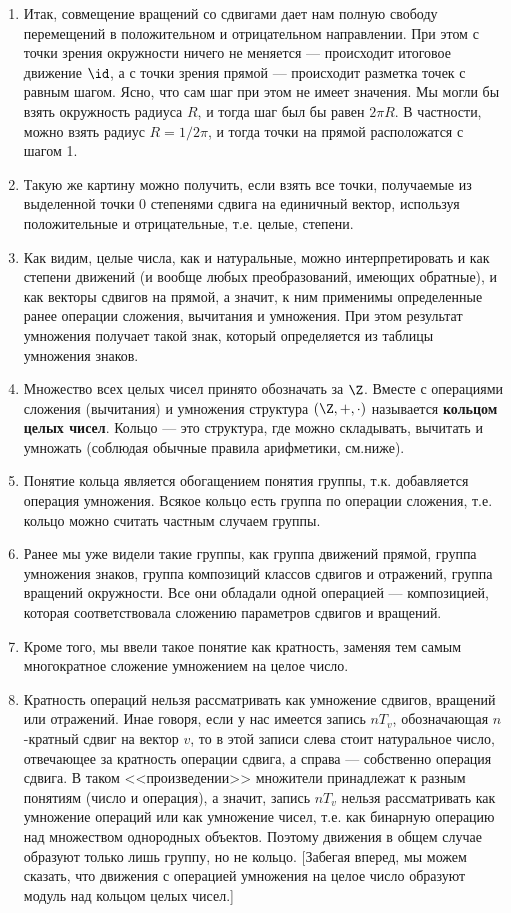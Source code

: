 \begin{enumerate}\setlength{\itemsep}{1pt}
\item Итак, совмещение вращений со сдвигами дает нам полную свободу перемещений в положительном и отрицательном направлении. При этом с точки зрения окружности ничего не меняется --- происходит итоговое движение $\id$, а с точки зрения прямой --- происходит разметка точек с равным шагом. Ясно, что сам шаг при этом не имеет значения. Мы могли бы взять окружность радиуса $R$, и тогда шаг был бы равен $2\pi R$. В частности, можно взять радиус $R=1/2\pi$, и тогда точки на прямой расположатся с шагом 1.
\item Такую же картину можно получить, если взять все точки, получаемые из выделенной точки 0 степенями сдвига на единичный вектор, используя положительные и отрицательные, т.е. целые, степени.
\item Как видим, целые числа, как и натуральные, можно интерпретировать и как степени движений (и вообще любых преобразований, имеющих обратные), и как векторы сдвигов на прямой, а значит, к ним применимы определенные ранее операции сложения, вычитания и умножения. При этом результат умножения получает такой знак, который определяется из таблицы умножения знаков.
\item Множество всех целых чисел принято обозначать за $\Z$. Вместе с операциями сложения (вычитания) и умножения структура $(\Z,+,\cdot)$ называется \textbf{кольцом целых чисел}. Кольцо --- это структура, где можно складывать, вычитать и умножать (соблюдая обычные правила арифметики, см.ниже).
\item Понятие кольца является обогащением понятия группы, т.к. добавляется операция умножения. Всякое кольцо есть группа по операции сложения, т.е. кольцо можно считать частным случаем группы.
\item Ранее мы уже видели такие группы, как группа движений прямой, группа умножения знаков, группа композиций классов сдвигов и отражений, группа вращений окружности. Все они обладали одной операцией --- композицией, которая соответствовала сложению параметров сдвигов и вращений.
\item Кроме того, мы ввели такое понятие как кратность, заменяя тем самым многократное сложение умножением на целое число.
\item Кратность операций нельзя рассматривать как умножение сдвигов, вращений или отражений. Инае говоря, если у нас имеется запись $nT_v$, обозначающая $n$-кратный сдвиг на вектор $v$, то в этой записи слева стоит натуральное число, отвечающее за кратность операции сдвига, а справа --- собственно операция сдвига. В таком <<произведении>> множители принадлежат к разным понятиям (число и операция), а значит, запись $nT_v$ нельзя рассматривать как умножение операций или как умножение чисел, т.е. как бинарную операцию над множеством однородных объектов. Поэтому движения в общем случае образуют только лишь группу, но не кольцо. [Забегая вперед, мы можем сказать, что движения с операцией умножения на целое число образуют модуль над кольцом целых чисел.]

\end{enumerate}
